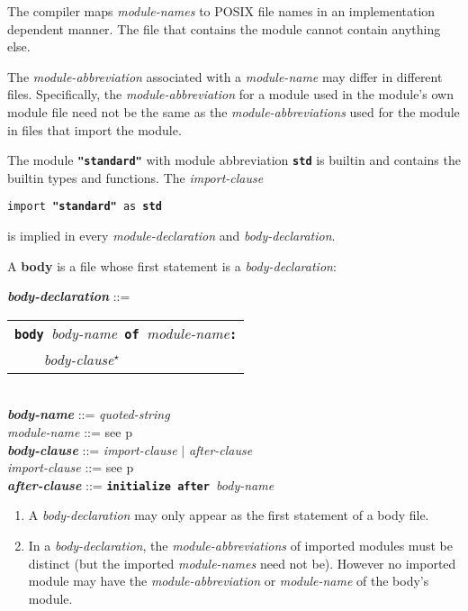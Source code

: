 \documentclass[12pt]{article}
\newcommand{\TT}[1]{{\tt \bfseries #1}}
\newcommand{\STAR}{{\Large $^\star$}}
\newcommand{\key}[1]{{\rm \bfseries #1}}
\newcommand{\ttkey}[1]{{\tt \bfseries #1}}
\newcommand{\emkey}[1]{{\em \bfseries #1}}
\newcommand{\pagref}[1]{p\pageref{#1}}
\newenvironment{indpar}[1][0.3in]%
	{\begin{list}{}%
		     {\setlength{\itemsep}{0in}%
		      \setlength{\topsep}{0in}%
		      \setlength{\parsep}{1ex}%
		      \setlength{\labelwidth}{#1}%
		      \setlength{\leftmargin}{#1}%
		      \addtolength{\leftmargin}{\labelsep}}%
	 \item}%
	{\end{list}}
\begin{document}
The compiler maps {\em module-names} to POSIX file names in an
implementation dependent manner.  The file that contains the
module cannot contain anything else.

The {\em module-abbreviation} associated with a {\em module-name}
may differ in different files.  Specifically, the {\em module-abbreviation}
for a module used in the module's own module file need not be the same
as the {\em module-abbreviations} used for the module in files
that import the module.

The module \TT{"standard"}\index{standard@\TT{"standard"}} with
module abbreviation \ttkey{std} is builtin and contains the builtin types and
functions.  The {\em import-clause}
\begin{center}
{\tt import }\TT{"standard"}{\tt{} as \ttkey{std}}
\end{center}
is implied in every {\em module-declaration} and
{\em body-declaration}.

A \key{body} is a file whose first statement is a {\em body-declaration}:

\begin{indpar}
\emkey{body-declaration}\label{BODY-DECLARATION} ::=
    \begin{tabular}[t]{l}
    \TT{body }{\em body-name}\TT{ of }{\em module-name}\TT{:} \\
    \TT{~~~~}{\em body-clause}\STAR{} \\
    \end{tabular}
\\[0.5ex]
\emkey{body-name} ::= {\em quoted-string}
\\[0.5ex]
{\em module-name} ::= see \pagref{MODULE-NAME}
\\[0.5ex]
\emkey{body-clause} ::= {\em import-clause} $|$ {\em after-clause}
\\[0.5ex]
{\em import-clause} ::= see \pagref{IMPORT-CLAUSE}
\\[0.5ex]
\emkey{after-clause} ::= \ttkey{initialize after }{\em body-name}

\begin{enumerate}

\item
A {\em body-declaration} may only appear as the first statement
of a body file.

\item
In a {\em body-declaration}, the {\em module-abbreviations} of imported
modules must be distinct (but the imported {\em module-names} need not be).
However no imported module may have the 
{\em module-abbreviation} or {\em module-name} of the body's module.
\end{enumerate}

\end{indpar}
\end{document}
